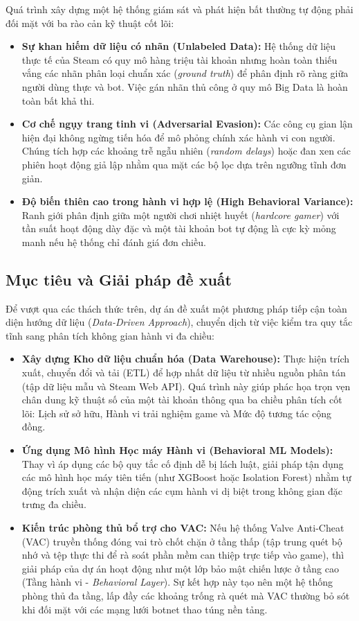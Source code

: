 Quá trình xây dựng một hệ thống giám sát và phát hiện bất thường tự động phải đối mặt với ba rào cản kỹ thuật cốt lõi:
\begin{itemize}
    \item \textbf{Sự khan hiếm dữ liệu có nhãn (Unlabeled Data):} Hệ thống dữ liệu thực tế của Steam có quy mô hàng triệu tài khoản nhưng hoàn toàn thiếu vắng các nhãn phân loại chuẩn xác (\textit{ground truth}) để phân định rõ ràng giữa người dùng thực và bot. Việc gán nhãn thủ công ở quy mô Big Data là hoàn toàn bất khả thi.
    \item \textbf{Cơ chế ngụy trang tinh vi (Adversarial Evasion):} Các công cụ gian lận hiện đại không ngừng tiến hóa để mô phỏng chính xác hành vi con người. Chúng tích hợp các khoảng trễ ngẫu nhiên (\textit{random delays}) hoặc đan xen các phiên hoạt động giả lập nhằm qua mặt các bộ lọc dựa trên ngưỡng tĩnh đơn giản.
    \item \textbf{Độ biến thiên cao trong hành vi hợp lệ (High Behavioral Variance):} Ranh giới phân định giữa một người chơi nhiệt huyết (\textit{hardcore gamer}) với tần suất hoạt động dày đặc và một tài khoản bot tự động là cực kỳ mỏng manh nếu hệ thống chỉ đánh giá đơn chiều.
\end{itemize}

\subsection{Mục tiêu và Giải pháp đề xuất}

Để vượt qua các thách thức trên, dự án đề xuất một phương pháp tiếp cận toàn diện hướng dữ liệu (\textit{Data-Driven Approach}), chuyển dịch từ việc kiểm tra quy tắc tĩnh sang phân tích không gian hành vi đa chiều:
\begin{itemize}
    \item \textbf{Xây dựng Kho dữ liệu chuẩn hóa (Data Warehouse):} Thực hiện trích xuất, chuyển đổi và tải (ETL) để hợp nhất dữ liệu từ nhiều nguồn phân tán (tập dữ liệu mẫu và Steam Web API). Quá trình này giúp phác họa trọn vẹn chân dung kỹ thuật số của một tài khoản thông qua ba chiều phân tích cốt lõi: Lịch sử sở hữu, Hành vi trải nghiệm game và Mức độ tương tác cộng đồng.
    \item \textbf{Ứng dụng Mô hình Học máy Hành vi (Behavioral ML Models):} Thay vì áp dụng các bộ quy tắc cố định dễ bị lách luật, giải pháp tận dụng các mô hình học máy tiên tiến (như XGBoost hoặc Isolation Forest) nhằm tự động trích xuất và nhận diện các cụm hành vi dị biệt trong không gian đặc trưng đa chiều.
    \item \textbf{Kiến trúc phòng thủ bổ trợ cho VAC:} Nếu hệ thống Valve Anti-Cheat (VAC) truyền thống đóng vai trò chốt chặn ở tầng thấp (tập trung quét bộ nhớ và tệp thực thi để rà soát phần mềm can thiệp trực tiếp vào game), thì giải pháp của dự án hoạt động như một lớp bảo mật chiến lược ở tầng cao (Tầng hành vi - \textit{Behavioral Layer}). Sự kết hợp này tạo nên một hệ thống phòng thủ đa tầng, lấp đầy các khoảng trống rà quét mà VAC thường bỏ sót khi đối mặt với các mạng lưới botnet thao túng nền tảng.
\end{itemize}